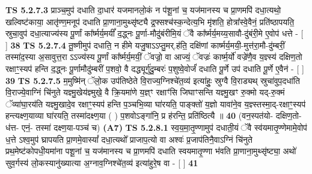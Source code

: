 \documentclass[17pt]{extarticle}
\begin{document}
                  \newline
                                \textbf{ TS 5.2.7.3} \newline
                  प्राञ्च॒मुप॑ दधाति दा॒धार॑ यजमानलो॒कं न प॑शू॒नां च॒ यज॑मानस्य च प्रा॒णमपि॑ दधा॒त्यथो॒ खल्विष्ट॑काया॒ आतृ॑ण्ण॒मनूप॑ दधाति प्रा॒णाना॒मुथ्सृ॑ष्ट्यै द्र॒फ्सश्च॑स्क॒न्देत्य॒भि मृ॑शति॒ होत्रा᳚स्वे॒वैनं॒ प्रति॑ष्ठापयति॒ स्रुचा॒वुप॑ दधा॒त्याज्य॑स्य पू॒र्णां का᳚र्ष्मर्य॒मयीं᳚ द॒द्ध्नः पू॒र्णा-मौदु॑बंरीमि॒यं ॅवै का᳚र्ष्मर्य॒मय्य॒सावौ-दु॑बंरी॒मे ए॒वोप॑ धत्ते - [  ] \textbf{  38} \newline
                  \newline
                                \textbf{ TS 5.2.7.4} \newline
                  तू॒ष्णीमुप॑ दधाति॒ न हीमे यजु॒षाऽऽप्तु॒मर्.ह॑ति॒ दक्षि॑णां कार्ष्मर्य॒मयी॒-मुत्त॑रा॒मौ-दु॑म्बरीं॒ तस्मा॑द॒स्या अ॒सावुत्त॒रा ऽऽज्य॑स्य पू॒र्णां का᳚र्ष्मर्य॒मयीं॒ ॅवज्रो॒ वा आज्यं॒ ॅवज्रः॑ कार्ष्म॒र्यो॑ वज्रे॑णै॒व य॒ज्ञ्स्य॑ दक्षिण॒तो रक्षाꣳ॒॒स्यप॑ हन्ति द॒द्ध्नः पू॒र्णामौदु॑म्बरीं प॒शवो॒ वै दद्ध्यूर्गु॑दु॒म्बरः॑ प॒शुष्वे॒वोर्जं॑ दधाति पू॒र्णे उप॑ दधाति पू॒र्णे ए॒वैन॑ - [  ] \textbf{  39} \newline
                  \newline
                                \textbf{ TS 5.2.7.5} \newline
                  म॒मुष्मि॑न् ॅलो॒क उप॑तिष्ठेते वि॒राज्य॒ग्निश्चे॑त॒व्य॑ इत्या॑हुः॒ स्रुग्वै वि॒राड्यथ् स्रुचा॑वुप॒दधा॑ति वि॒राज्ये॒वाग्निं चि॑नुते यज्ञ्मु॒खेय॑ज्ञ्मुखे॒ वै क्रि॒यमा॑णे य॒ज्ञ्ꣳ रक्षाꣳ॑सि जिघाꣳसन्ति यज्ञ्मु॒खꣳ रु॒क्मो यद्-रु॒क्मं ॅव्या॑घा॒रय॑ति यज्ञ्मु॒खादे॒व रक्षाꣳ॒॒स्यप॑ हन्ति प॒ञ्चभि॒व्या घा॑रयति॒ पाङ्क्तो॑ य॒ज्ञो यावा॑ने॒व य॒ज्ञ्स्तस्मा॒द्-रक्षाꣳ॒॒स्यप॑ हन्त्यक्ष्ण॒याव्या घा॑रयति॒ तस्मा॑दक्ष्ण॒या ( ) प॒शवोऽङ्गा॑नि॒ प्र ह॑रन्ति॒ प्रति॑ष्ठित्यै ॥ \textbf{  40 } \newline
                  \newline
                       (वन॒स्पत॑यो- दक्षिण॒तो- ध॑त्त- एनं॒- तस्मा॑ दक्ष्ण॒या-पञ्च॑ च)  \textbf{(A7)} \newline \newline
                                        \textbf{ TS 5.2.8.1} \newline
                  स्व॒य॒मा॒तृ॒ण्णामुप॑ दधाती॒यं ॅवै स्व॑यमातृ॒ण्णेमामे॒वोप॑ ध॒त्ते ऽश्व॒मुप॑ घ्रापयति प्रा॒णमे॒वास्यां᳚ दधा॒त्यथो᳚ प्राजाप॒त्यो वा अश्वः॑ प्र॒जाप॑तिनै॒वाऽग्निं चि॑नुते प्रथ॒मेष्ट॑कोपधी॒यमा॑ना पशू॒नां च॒ यज॑मानस्य च प्रा॒णमपि॑ दधाति स्वयमातृ॒ण्णा भ॑वति प्रा॒णाना॒मुथ्सृ॑ष्ट्या॒ अथो॑ सुव॒र्गस्य॑ लो॒कस्यानु॑ख्यात्या अ॒ग्नाव॒ग्निश्चे॑त॒व्य॑ इत्या॑हुरे॒ष वा - [  ] \textbf{  41} \newline
\end{document}
